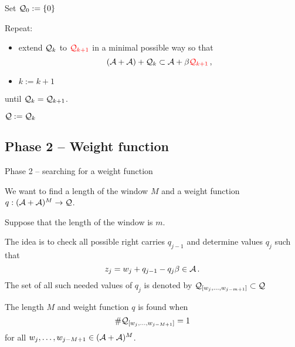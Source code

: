       Set $\mathcal{Q}_0:=\{0\}$
      
      
      Repeat:
      \begin{itemize}
          \item extend $\mathcal{Q}_k$ to $\textcolor{red}{\mathcal{Q}_{k+1}}$ in a minimal possible way so that
           $$
              (\mathcal{A}+\mathcal{A})+ \mathcal{Q}_k \subset \mathcal{A} + \beta \textcolor{red}{\mathcal{Q}_{k+1}}\,,
           $$
           \item $k:=k+1$
      \end{itemize}
      
      until $\mathcal{Q}_k = \mathcal{Q}_{k+1}$.
      
      
      \vspace{7pt}
      $\mathcal{Q}:=\mathcal{Q}_k$
    





\subsection{Phase 2 -- Weight function}

    {Phase 2 -- searching for a weight function}

    We want to find a length of the window $M$ and a weight function $q:(\mathcal{A}+\mathcal{A})^{M} \to \mathcal{Q}$.%
    
    
    Suppose that the length of the window is $m$.
    
    The idea is to check all possible right carries $q_{j-1}$ and determine values $q_j$ such that 
    $$
    z_j=w_j + q_{j-1} - q_j \beta \in \mathcal{A} \,.
    $$
    The set of all such needed values of $q_j$ is denoted by $\mathcal{Q}_{[w_{j},\dots, w_{j-m+1}]}\subset \mathcal{Q}$
        
    
    The length $M$ and weight function $q$ is found when 
    $$
    \#\mathcal{Q}_{[w_{j},\dots, w_{j-M+1}]}=1
    $$
    for all $w_{j},\dots, w_{j-M+1} \in (\mathcal{A}+\mathcal{A})^M$.
    



